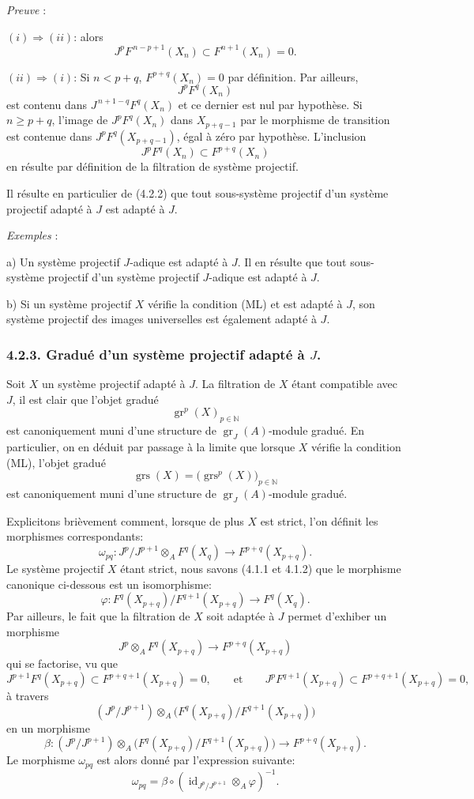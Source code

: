 \documentclass[11pt]{article}
\providecommand{\gr}{\operatorname{gr}}
\providecommand{\id}{\operatorname{id}}
\providecommand{\id}{\operatorname{id}}
\providecommand{\gr}{\operatorname{gr}}
\providecommand{\gr}{\operatorname{gr}}
\providecommand{\grs}{\operatorname{grs}}
\providecommand{\id}{\operatorname{id}}
\providecommand{\id}{\operatorname{id}}
\providecommand{\id}{\operatorname{id}}
\providecommand{\id}{\operatorname{id}}
\begin{document}
\emph{Preuve} :

\((i)\Rightarrow(ii)\): alors
\[
J^pF^{\,n-p+1}(X_n)\subset F^{n+1}(X_n)=0.
\]

\((ii)\Rightarrow(i)\): Si \(n<p+q\), \(F^{p+q}(X_n)=0\) par définition. Par
ailleurs,
\[
J^pF^q(X_n)
\]
est contenu dans \(J^{\,n+1-q}F^q(X_n)\) et ce dernier est nul par hypothèse. Si \(n\ge p+q\), l'image de \(J^pF^q(X_n)\) dans \(X_{p+q-1}\) par le morphisme de transition est contenue dans \(J^pF^q(X_{p+q-1})\), égal à zéro par hypothèse. L'inclusion
\[
J^pF^q(X_n)\subset F^{p+q}(X_n)
\]
en résulte par définition de la filtration de système projectif.

Il résulte en particulier de (4.2.2) que tout sous-système projectif d'un système projectif adapté à \(J\) est adapté à \(J\).

\emph{Exemples} :

a) Un système projectif \(J\)-adique est adapté à \(J\). Il en résulte que tout sous-système projectif d'un système projectif \(J\)-adique est adapté à \(J\).

b) Si un système projectif \(X\) vérifie la condition (ML) et est adapté à \(J\), son système projectif des images universelles est également adapté à \(J\).

\subsubsection*{4.2.3. Gradué d'un système projectif adapté à \(J\).}
Soit \(X\) un système projectif adapté à \(J\). La filtration de \(X\) étant compatible avec \(J\), il est clair que l'objet gradué
\[
\gr^p(X)_{p\in\mathbb N}
\]
est canoniquement muni d'une structure de \(\gr_J(A)\)-module gradué. En particulier, on en déduit par passage à la limite que lorsque \(X\) vérifie la condition (ML), l'objet gradué
\[
\grs(X)=\bigl(\grs^p(X)\bigr)_{p\in\mathbb N}
\]
est canoniquement muni d'une structure de \(\gr_J(A)\)-module gradué.

Explicitons brièvement comment, lorsque de plus \(X\) est strict, l'on définit les morphismes correspondants:
\[
\omega_{pq}: J^p/J^{p+1}\otimes_A F^q(X_q)\longrightarrow F^{p+q}(X_{p+q}).
\]
Le
système projectif \(X\) étant strict, nous savons (4.1.1 et 4.1.2) que le morphisme canonique ci-dessous est un isomorphisme:
\[
\varphi:F^q(X_{p+q})/F^{q+1}(X_{p+q})\longrightarrow F^q(X_q).
\]
Par ailleurs, le fait que la filtration de \(X\) soit adaptée à \(J\) permet d'exhiber un morphisme
\[
J^p\otimes_A F^q(X_{p+q})\longrightarrow F^{p+q}(X_{p+q})
\]
qui se factorise, vu que
\[
J^{p+1}F^q(X_{p+q})\subset F^{p+q+1}(X_{p+q})=0,\qquad\text{et}\qquad
J^pF^{q+1}(X_{p+q})\subset F^{p+q+1}(X_{p+q})=0,
\]
à travers
\[
(J^p/J^{p+1})\otimes_A
\bigl(F^q(X_{p+q})/F^{q+1}(X_{p+q})\bigr)
\]
en un morphisme
\[
\beta:(J^p/J^{p+1})\otimes_A
\bigl(F^q(X_{p+q})/F^{q+1}(X_{p+q})\bigr)
\longrightarrow F^{p+q}(X_{p+q}).
\]
Le morphisme \(\omega_{pq}\) est alors donné par l'expression suivante:
\[
\omega_{pq}=\beta\circ(\id_{J^p/J^{p+1}}\otimes_A\varphi)^{-1}.
\]
\end{document}
